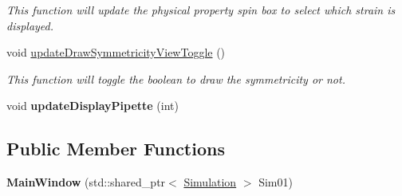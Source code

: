 \begin{DoxyCompactItemize}
\begin{DoxyCompactList}\small\item\em This function will update the physical property spin box to select which strain is displayed. \end{DoxyCompactList}\item 
\hypertarget{classMainWindow_a43031416fc2795d2b3cda8a158476549}{}void \hyperlink{classMainWindow_a43031416fc2795d2b3cda8a158476549}{update\+Draw\+Symmetricity\+View\+Toggle} ()\label{classMainWindow_a43031416fc2795d2b3cda8a158476549}

\begin{DoxyCompactList}\small\item\em This function will toggle the boolean to draw the symmetricity or not. \end{DoxyCompactList}\item 
\hypertarget{classMainWindow_ad30193e1dac5d64c7467e576e238ce03}{}void {\bfseries update\+Display\+Pipette} (int)\label{classMainWindow_ad30193e1dac5d64c7467e576e238ce03}

\end{DoxyCompactItemize}
\subsection*{Public Member Functions}
\begin{DoxyCompactItemize}
\item 
\hypertarget{classMainWindow_acc6787844dd93200e0190709e39543dc}{}{\bfseries Main\+Window} (std\+::shared\+\_\+ptr$<$ \hyperlink{classSimulation}{Simulation} $>$ Sim01)\label{classMainWindow_acc6787844dd93200e0190709e39543dc}

\end{DoxyCompactItemize}
